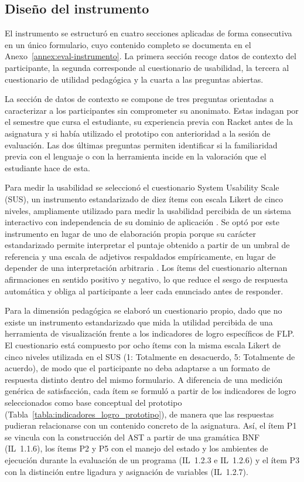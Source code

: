 \subsection{Diseño del instrumento}

El instrumento se estructuró en cuatro secciones aplicadas de forma consecutiva en un único formulario, cuyo contenido completo se documenta en el Anexo~\ref{annex:eval-instrumento}. La primera sección recoge datos de contexto del participante, la segunda corresponde al cuestionario de usabilidad, la tercera al cuestionario de utilidad pedagógica y la cuarta a las preguntas abiertas.

La sección de datos de contexto se compone de tres preguntas orientadas a caracterizar a los participantes sin comprometer su anonimato. Estas indagan por el semestre que cursa el estudiante, su experiencia previa con Racket antes de la asignatura y si había utilizado el prototipo con anterioridad a la sesión de evaluación. Las dos últimas preguntas permiten identificar si la familiaridad previa con el lenguaje o con la herramienta incide en la valoración que el estudiante hace de esta.

Para medir la usabilidad se seleccionó el cuestionario System Usability Scale (SUS), un instrumento estandarizado de diez ítems con escala Likert de cinco niveles, ampliamente utilizado para medir la usabilidad percibida de un sistema interactivo con independencia de su dominio de aplicación \cite{brooke1996sus}. Se optó por este instrumento en lugar de uno de elaboración propia porque su carácter estandarizado permite interpretar el puntaje obtenido a partir de un umbral de referencia y una escala de adjetivos respaldados empíricamente, en lugar de depender de una interpretación arbitraria \cite{bangor2009determining}. Los ítems del cuestionario alternan afirmaciones en sentido positivo y negativo, lo que reduce el sesgo de respuesta automática y obliga al participante a leer cada enunciado antes de responder.

Para la dimensión pedagógica se elaboró un cuestionario propio, dado que no existe un instrumento estandarizado que mida la utilidad percibida de una herramienta de visualización frente a los indicadores de logro específicos de FLP. El cuestionario está compuesto por ocho ítems con la misma escala Likert de cinco niveles utilizada en el SUS (1: Totalmente en desacuerdo, 5: Totalmente de acuerdo), de modo que el participante no deba adaptarse a un formato de respuesta distinto dentro del mismo formulario. A diferencia de una medición genérica de satisfacción, cada ítem se formuló a partir de los indicadores de logro seleccionados como base conceptual del prototipo (Tabla~\ref{tabla:indicadores_logro_prototipo}), de manera que las respuestas pudieran relacionarse con un contenido concreto de la asignatura. Así, el ítem P1 se vincula con la construcción del AST a partir de una gramática BNF (IL~1.1.6), los ítems P2 y P5 con el manejo del estado y los ambientes de ejecución durante la evaluación de un programa (IL~1.2.3 e IL~1.2.6) y el ítem P3 con la distinción entre ligadura y asignación de variables (IL~1.2.7).

